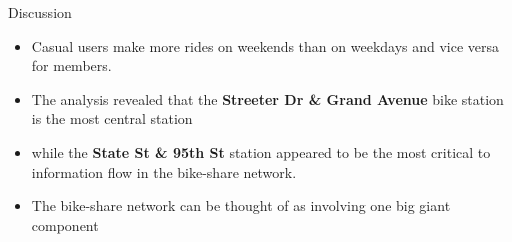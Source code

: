\documentclass[11pt, xcolor=dvipsnames]{beamer}
\begin{document}
  \begin{frame}{Discussion}
  	\begin{itemize}
  		\item  Casual users make more rides on weekends than on weekdays and vice versa for members. 
  		\item The analysis revealed that the \textbf{Streeter Dr \& Grand Avenue }bike station is the most central station
  		\item while the \textbf{State St \& 95th St }station appeared to be the most critical to information flow in the bike-share network.  
  		\item The bike-share network can be thought of as involving one big giant component 
  		
  		
  	\end{itemize}
  \end{frame}
\end{document}

